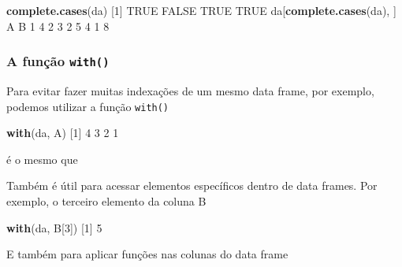 \documentclass[10pt,a4paper]{book}
\newenvironment{Shaded}{\begin{snugshade}}{\end{snugshade}}
\newcommand{\KeywordTok}[1]{\textcolor[rgb]{0.13,0.29,0.53}{\textbf{#1}}}
\newcommand{\DecValTok}[1]{\textcolor[rgb]{0.00,0.00,0.81}{#1}}
\newcommand{\OtherTok}[1]{\textcolor[rgb]{0.56,0.35,0.01}{#1}}
\newcommand{\OperatorTok}[1]{\textcolor[rgb]{0.81,0.36,0.00}{\textbf{#1}}}
\newcommand{\NormalTok}[1]{#1}
\begin{document}
\begin{Shaded}
\begin{Highlighting}[]
\KeywordTok{complete.cases}\NormalTok{(da)}
\NormalTok{[}\DecValTok{1}\NormalTok{]  }\OtherTok{TRUE} \OtherTok{FALSE}  \OtherTok{TRUE}  \OtherTok{TRUE}
\NormalTok{da[}\KeywordTok{complete.cases}\NormalTok{(da), ]}
\NormalTok{  A B}
\DecValTok{1} \DecValTok{4} \DecValTok{2}
\DecValTok{3} \DecValTok{2} \DecValTok{5}
\DecValTok{4} \DecValTok{1} \DecValTok{8}
\end{Highlighting}
\end{Shaded}

\subsubsection{\texorpdfstring{A função
\texttt{with()}}{A função with()}}\label{a-funuxe7uxe3o-with}

Para evitar fazer muitas indexações de um mesmo data frame, por exemplo,
podemos utilizar a função \texttt{with()}

\begin{Shaded}
\begin{Highlighting}[]
\KeywordTok{with}\NormalTok{(da, A)}
\NormalTok{[}\DecValTok{1}\NormalTok{] }\DecValTok{4} \DecValTok{3} \DecValTok{2} \DecValTok{1}
\end{Highlighting}
\end{Shaded}

é o mesmo que

\begin{Shaded}
\end{Shaded}

Também é útil para acessar elementos específicos dentro de data frames.
Por exemplo, o terceiro elemento da coluna B

\begin{Shaded}
\begin{Highlighting}[]
\KeywordTok{with}\NormalTok{(da, B[}\DecValTok{3}\NormalTok{])}
\NormalTok{[}\DecValTok{1}\NormalTok{] }\DecValTok{5}
\end{Highlighting}
\end{Shaded}

E também para aplicar funções nas colunas do data frame
\end{document}
